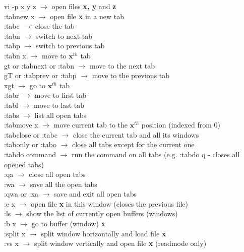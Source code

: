 \documentclass[twoside,a4paper]{article}
\newcommand{\tcb}{\color{blue}} \newcommand{\tcc}{\color{cyan}} \newcommand{\tcr}{\color{red}}
\newcommand{\tck}{\color{black}}
\newcommand{\ra }{$\rightarrow$ }
\begin{document}
\begin{multicols}{2}
    \tcr vi \tcb  -p x y z \tck $\rightarrow$ open files \textbf{x, y} and \textbf{z}\\
    \tcr :tabnew \tcb  x \tck $\rightarrow$ open file \textbf{x} in a new tab\\
    \tcr :tabc \tck \ra close the tab\\
    \tcr :tabn \tck \ra switch to next tab\\
    \tcr :tabp \tck \ra switch to previous tab\\
    \tcr :tabn \tcb  x \tck \ra move to $\textbf{x}^{th}$ tab\\
    \tcr gt or :tabnext or :tabn \tck $\rightarrow$ move to the next tab\\
    \tcr gT or :tabprev or :tabp \tck $\rightarrow$ move to the previous tab\\
    \tcr xgt \tck \ra go to $\textbf{x}^{th}$ tab\\
    \tcr :tabr \tck \ra move to first tab\\
    \tcr :tabl \tck \ra move to last tab\\
    \tcr :tabs \tck \ra list all open tabs\\
    \tcr :tabmove \tcb  x \tck $\rightarrow$ move current tab to the $\textbf{x}^{th}$ position
    (indexed from 0)\\
    \tcr :tabclose or :tabc \tck \ra close the current tab and all its windows\\
    \tcr :tabonly or :tabo \tck \ra close all tabs except for the current one\\
    \tcr :tabdo \tcb  command \tck \ra run the command on all tabs (e.g. :tabdo q - closes all
    opened tabs)\\
    \tcr :qa \tck \ra close all open tabs\\
    \tcr :wa \tck \ra save all the open tabs\\
    \tcr :qwa or :xa \tck \ra save and exit all open tabs\\
    \tcr :e \tcb  x \tck \ra open file \textbf{x} in this window (closes the previous file)\\
    \tcr :ls \tck \ra show the list of currently open buffers (windows)\\
    \tcr :b \tcb  x \tck \ra go to buffer (window) \textbf{x}\\
    \tcr :split \tcb  x \tck \ra split window horizontally and load file \textbf{x}\\
    \tcr :vs \tcb  x \tck \ra split window vertically and open file \textbf{x} (readmode only)\\

\end{multicols}
\end{document}
